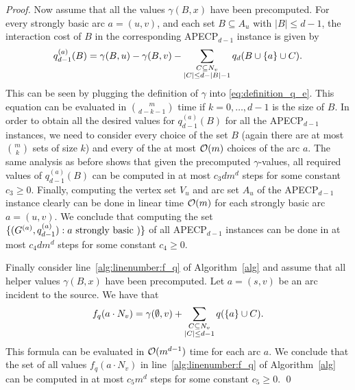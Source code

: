 \begin{proof}
    Now assume that all the values $\gamma(B, x)$ have been precomputed. For every strongly basic arc $a = (u, v)$, and each set $B \subseteq A_u$ with $|B| \leq d-1$, the interaction cost of $B$ in the corresponding APECP$_{d-1}$ instance is given by
    \begin{align*}
        q_{d-1}^{(a)}(B) = \gamma(B,u) - \gamma(B, v) - \sum_{\substack{C \subseteq N_v\\ |C| \leq d - |B| - 1}}q_d(B \cup \{ a \} \cup C).
    \end{align*}
    This can be seen by plugging the definition of $\gamma$ into \cref{eq:definition_q_e}. This equation can be evaluated in $\binom{m}{d - k -1}$ time if $k=0,\dots,d-1$ is the size of $B$. In order to obtain all the desired values for $q^{(a)}_{d-1}(B)$ for all the APECP$_{d-1}$ instances, we need to consider every choice of the set $B$ (again there are at most $\binom{m}{k}$ sets of size $k$) and every of the at most $\mathcal{O}(m)$ choices of the arc $a$. 
    The same analysis as before shows that given the precomputed $\gamma$-values, all required values of $q^{(a)}_{d-1}(B)$ can be computed in at most $c_3dm^d$ steps for some constant $c_3 \geq 0$. Finally, computing the vertex set $V_u$ and arc set $A_u$ of the APECP$_{d-1}$ instance clearly can be done in linear time $\mathcal{O}(m)$ for each strongly basic arc $a = (u,v)$. We conclude that computing the set $\{ (G^{(a)}, q^{(a)}_{d-1}) : a \text{ strongly basic }) \}$ of all APECP$_{d-1}$ instances can be done in at most $c_4dm^d$ steps for some constant $c_4 \geq 0$.

    
    Finally consider line~\ref{alg:linenumber:f_q} of Algorithm~\ref{alg} and assume that all helper values $\gamma(B,x)$ have been precomputed. Let $a = (s,v)$ be an arc incident to the source. We have that
    \begin{align*}
        f_q(a \cdot N_v) = \gamma(\emptyset, v) + \sum_{\substack{C \subseteq N_v\\ |C| \leq d - 1}}q(\{ a \} \cup C).
    \end{align*}
    This formula can be evaluated in $\mathcal{O}(m^{d-1})$ time for each arc $a$. We conclude that the set of all values $f_q(a \cdot N_v)$ in line~\ref{alg:linenumber:f_q} of Algorithm~\ref{alg} can be computed in at most $c_5m^d$ steps for some constant $c_5 \geq 0$.
    \qed
\end{proof}

